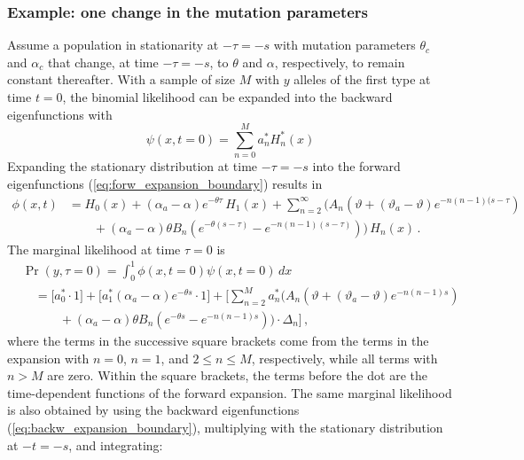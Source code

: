 \documentclass[preprint]{elsarticle}
\begin{document}
\subsubsection{Example: one change in the mutation parameters}

Assume a population in stationarity at $-\tau=-s$ with mutation parameters $\theta_c$ and $\alpha_c$ that change, at time $-\tau=-s$, to $\theta$ and $\alpha$, respectively, to remain constant thereafter. With a sample of size $M$ with $y$ alleles of the first type at time $t=0$, the binomial likelihood can be expanded into the backward eigenfunctions with 
\begin{equation}
    \psi(x,t=0)=\sum_{n=0}^M a_n^{*} H_n^{*}(x)
\end{equation}
Expanding the stationary distribution at time $-\tau=-s$ into the forward eigenfunctions (\ref{eq:forw_expansion_boundary}) results in
\begin{equation}
\begin{split}
    \phi(x,t)&= H_0(x)+(\alpha_a-\alpha) e^{-\theta \tau}\,H_1(x)+\sum_{n=2}^\infty \bigg(A_n(\vartheta+(\vartheta_a-\vartheta) e^{-n(n-1)(s-\tau})\\
    &\qquad+(\alpha_a-\alpha) \theta B_n (e^{-\theta (s-\tau)}-e^{-n(n-1) (s-\tau)})\bigg)\,H_n(x)\,.
\end{split}
\end{equation}
The marginal likelihood at time $\tau=0$ is
\begin{equation}
\begin{split}
    &\Pr(y,\tau=0)=\int_0^1 \phi(x,t=0)\psi(x,t=0)\,dx\\
    &\quad=\bigg[a_0^{*}\cdot 1\bigg]+\bigg[a_1^{*}(\alpha_a-\alpha) e^{-\theta s}\cdot 1\bigg]+\bigg[\sum_{n=2}^M a_n^{*}\bigg(A_n(\vartheta+(\vartheta_a-\vartheta) e^{-n(n-1)s}) \\
    &\quad\qquad+(\alpha_a-\alpha)\theta B_n (e^{-\theta s}-e^{-n(n-1) s})\bigg)\cdot\Delta_n\bigg]\,,\
\end{split}
\end{equation}
where the terms in the successive square brackets come from the terms in the expansion with $n=0$, $n=1$, and $2\leq n\leq M$, respectively, while all terms with $n>M$ are zero. Within the square brackets, the terms before the dot are the time-dependent functions of the forward expansion. The same marginal likelihood is also obtained by using the backward eigenfunctions (\ref{eq:backw_expansion_boundary}), multiplying with the stationary distribution at $-t=-s$, and integrating:
\end{document}
